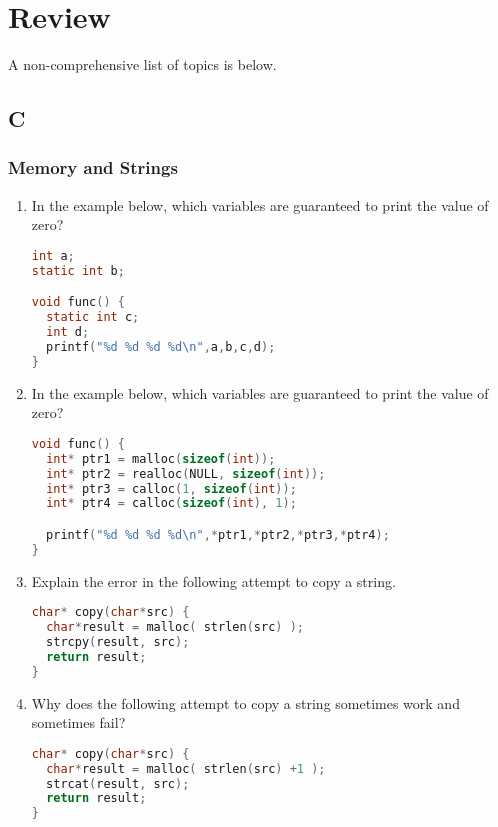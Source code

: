 \chapter{Review}

A non-comprehensive list of topics is below.

\section{C}

\subsection{Memory and Strings}

\begin{enumerate}

\item In the example below, which variables are guaranteed to print the value of zero?

\begin{lstlisting}[language=C]
int a;
static int b;

void func() {
  static int c;
  int d;
  printf("%d %d %d %d\n",a,b,c,d);
}
\end{lstlisting}

\item In the example below, which variables are guaranteed to print the value of zero?

\begin{lstlisting}[language=C]
void func() {
  int* ptr1 = malloc(sizeof(int));
  int* ptr2 = realloc(NULL, sizeof(int));
  int* ptr3 = calloc(1, sizeof(int));
  int* ptr4 = calloc(sizeof(int), 1);

  printf("%d %d %d %d\n",*ptr1,*ptr2,*ptr3,*ptr4);
}
\end{lstlisting}

\item Explain the error in the following attempt to copy a string.

\begin{lstlisting}[language=C]
char* copy(char*src) {
  char*result = malloc( strlen(src) );
  strcpy(result, src);
  return result;
}
\end{lstlisting}

\item Why does the following attempt to copy a string sometimes work and sometimes fail?

\begin{lstlisting}[language=C]
char* copy(char*src) {
  char*result = malloc( strlen(src) +1 );
  strcat(result, src);
  return result;
}
\end{lstlisting}


\end{enumerate}
